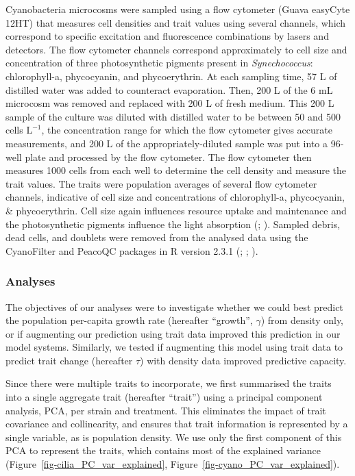 \documentclass[
  letterpaper,
  DIV=11,
  numbers=noendperiod]{scrartcl}
\begin{document}
Cyanobacteria microcosms were sampled using a flow cytometer (Guava
easyCyte 12HT) that measures cell densities and trait values using
several channels, which correspond to specific excitation and
fluorescence combinations by lasers and detectors. The flow cytometer
channels correspond approximately to cell size and concentration of
three photosynthetic pigments present in \emph{Synechococcus}:
chlorophyll-a, phycocyanin, and phycoerythrin. At each sampling time, 57
\textmu  L of distilled water was added to counteract evaporation. Then,
200 \textmu L of the 6 mL microcosm was removed and replaced with 200
\textmu L of fresh medium. This 200 \textmu L sample of the culture was
diluted with distilled water to be between 50 and 500 cells
\textmu \(\mathrm{L}^{-1}\), the concentration range for which the flow
cytometer gives accurate measurements, and 200 \textmu L of the
appropriately-diluted sample was put into a 96-well plate and processed
by the flow cytometer. The flow cytometer then measures 1000 cells from
each well to determine the cell density and measure the trait values.
The traits were population averages of several flow cytometer channels,
indicative of cell size and concentrations of chlorophyll-a,
phycocyanin, \& phycoerythrin. Cell size again influences resource
uptake and maintenance and the photosynthetic pigments influence the
light absorption (;
). Sampled debris, dead
cells, and doublets were removed from the analysed data using the
CyanoFilter and PeacoQC packages in R version 2.3.1
(;
; ).

\subsubsection{Analyses}\label{analyses}

The objectives of our analyses were to investigate whether we could best
predict the population per-capita growth rate (hereafter ``growth'',
\(\gamma\)) from density only, or if augmenting our prediction using
trait data improved this prediction in our model systems. Similarly, we
tested if augmenting this model using trait data to predict trait change
(hereafter \(\tau\)) with density data improved predictive capacity.

Since there were multiple traits to incorporate, we first summarised the
traits into a single aggregate trait (hereafter ``trait'') using a
principal component analysis, PCA, per strain and treatment. This
eliminates the impact of trait covariance and collinearity, and ensures
that trait information is represented by a single variable, as is
population density. We use only the first component of this PCA to
represent the traits, which contains most of the explained variance
(Figure~\ref{fig-cilia_PC_var_explained},
Figure~\ref{fig-cyano_PC_var_explained}).
\end{document}
